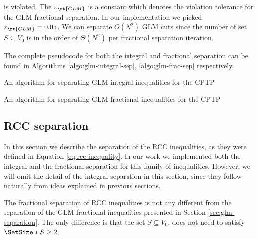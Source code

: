 is violated.
The $\varepsilon_{\mt{GLM}}$ is a constant which denotes the violation tolerance for the GLM fractional separation.
In our implementation we picked $\varepsilon_{\mt{GLM}} = 0.05$.
We can separate $O(N^2)$ GLM cuts since the number of set $S \subseteq V_0$ is in the order of $\Theta(N^2)$ per fractional separation iteration.

The complete pseudocode for both the integral and fractional separation can be found in Algorithms \ref{algo:glm-integral-sep}, \ref{algo:glm-frac-sep} respectively.


\begin{algorithm}
	\caption{An algorithm for separating GLM integral inequalities for the CPTP}
	\label{algo:glm-integral-sep}
	
\end{algorithm}


\begin{algorithm}
	\caption{An algorithm for separating GLM fractional inequalities for the CPTP}
	\label{algo:glm-frac-sep}
	
\end{algorithm}



\subsection{RCC separation}\label{sec:rcc-separation}
In this section we describe the separation of the RCC inequalities, as they were defined in Equation \eqref{eq:rcc-inequality}.
In our work we implemented both the integral and the fractional separation for this family of inequalities.
However, we will omit the detail of the integral separation in this section, since they follow naturally from ideas explained in previous sections.

The fractional separation of RCC inequalities is not any different from the separation of the GLM fractional inequalities presented in Section \ref{sec:glm-separation}.
The only difference is that the set $S \subseteq V_0$, does not need to satisfy $\SetSize*{S} \ge 2$.

